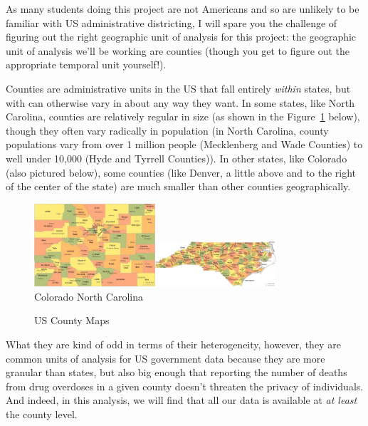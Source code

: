 \documentclass[12pt]{article}
\begin{document}
As many students doing this project are not Americans and so are unlikely to be familiar with US administrative districting, I will spare you the challenge of figuring out the right geographic unit of analysis for this project: the geographic unit of analysis we'll be working are counties (though you get to figure out the appropriate temporal unit yourself!).

Counties are administrative units in the US that fall entirely \emph{within} states, but with can otherwise vary in about any way they want. In some states, like North Carolina, counties are relatively regular in size (as shown in the Figure~\ref{counties} below), though they often vary radically in population (in North Carolina, county populations vary from over 1 million people (Mecklenberg and Wade Counties) to well under 10,000 (Hyde and Tyrrell Counties)). In other states, like Colorado (also pictured below), some counties (like Denver, a little above and to the right of the center of the state) are much smaller than other counties geographically.

\begin{figure}[h!]
  \centering
  \caption{US County Maps}\label{counties}
  \includegraphics[width=0.4\textwidth]{images/CO_counties.jpg}\includegraphics[width=0.4\textwidth]{images/NC_counties.jpg}\\
  \scriptsize{Colorado \hspace*{5cm} North Carolina}
\end{figure}

What they are kind of odd in terms of their heterogeneity, however, they are common units of analysis for US government data because they are more granular than states, but also big enough that reporting the number of deaths from drug overdoses in a given county doesn't threaten the privacy of individuals. And indeed, in this analysis, we will find that all our data is available at \emph{at least} the county level.
\end{document}
